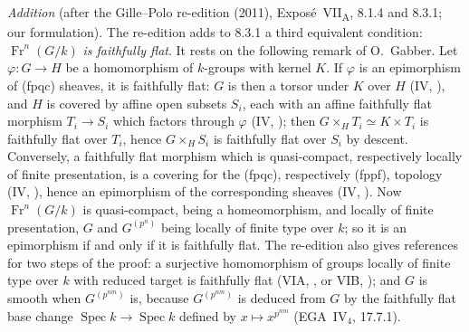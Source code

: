 \par\medskip\noindent
\emph{Addition} (after the Gille--Polo re-edition (2011),
Expos\'e~VII\textsubscript{A}, 8.1.4 and 8.3.1; our formulation). The
re-edition adds to 8.3.1 a third equivalent condition:
\(\operatorname{Fr}^n(G/k)\) \emph{is faithfully flat}. It rests on the
following remark of O.~Gabber. Let \(\varphi:G\to H\) be a homomorphism of
\(k\)-groups with kernel \(K\). If \(\varphi\) is an epimorphism of
(fpqc) sheaves, it is faithfully flat: \(G\) is then a torsor under \(K\)
over \(H\) (IV, ), and \(H\) is covered by affine open subsets
\(S_i\), each with an affine faithfully flat morphism \(T_i\to S_i\) which
factors through \(\varphi\) (IV, ); then
\(G\times_HT_i\simeq K\times T_i\) is faithfully flat over \(T_i\), hence
\(G\times_HS_i\) is faithfully flat over \(S_i\) by descent. Conversely, a
faithfully flat morphism which is quasi-compact, respectively locally of
finite presentation, is a covering for the (fpqc), respectively (fppf),
topology (IV, ), hence an epimorphism of the corresponding sheaves
(IV, ). Now \(\operatorname{Fr}^n(G/k)\) is quasi-compact, being a
homeomorphism, and locally of finite presentation, \(G\) and
\(G^{(p^n)}\) being locally of finite type over \(k\); so it is an
epimorphism if and only if it is faithfully flat. The re-edition also
gives references for two steps of the proof: a surjective homomorphism of
groups locally of finite type over \(k\) with reduced target is
faithfully flat (VIA, , or VIB, ); and \(G\) is smooth when
\(G^{(p^{nm})}\) is, because \(G^{(p^{nm})}\) is deduced from \(G\) by
the faithfully flat base change \(\operatorname{Spec}k\to\operatorname{Spec}k\)
defined by \(x\mapsto x^{p^{nm}}\) (EGA~IV\(_4\), 17.7.1).

